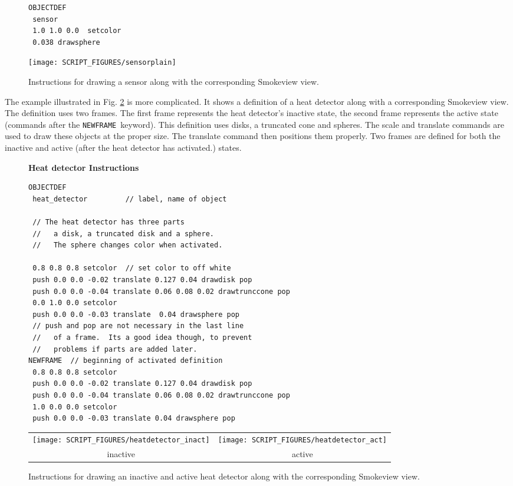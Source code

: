 \documentclass[11pt,twoside]{book}
\begin{document}
\begin{figure}[\figoptions]
{\small
\begin{lstlisting}[frame=single,rulecolor=\color{yellow},
framerule=1pt,framesep=1pc,fillcolor=\color{yellow}]
OBJECTDEF
 sensor
 1.0 1.0 0.0  setcolor
 0.038 drawsphere
\end{lstlisting}
}
\begin{center}
\texttt{[image: SCRIPT\_FIGURES/sensorplain]}\\
\end{center}
\caption{Instructions for drawing a sensor along with the corresponding Smokeview view.}
\label{figsensor}%
\end{figure}

The example illustrated in Fig. \ref{figsprinkler} is more complicated.
It shows a definition of a heat detector along with a corresponding
Smokeview view. The definition uses two frames. The first frame represents
the heat detector's inactive state, the second frame represents the active
state (commands after the {\tt NEWFRAME}\ keyword). This definition uses
disks, a truncated cone and spheres. The scale and translate commands are
used to draw these objects at the proper size. The translate command then
positions them properly.  Two frames are defined for both the inactive and
active (after the heat detector has activated.) states.

\begin{figure}[\figoptions]
{\bf Heat detector Instructions}\\
{\small
\begin{lstlisting}[frame=single,rulecolor=\color{yellow},
framerule=1pt,framesep=1pc,fillcolor=\color{yellow}]
OBJECTDEF
 heat_detector         // label, name of object

 // The heat detector has three parts
 //   a disk, a truncated disk and a sphere.
 //   The sphere changes color when activated.

 0.8 0.8 0.8 setcolor  // set color to off white
 push 0.0 0.0 -0.02 translate 0.127 0.04 drawdisk pop
 push 0.0 0.0 -0.04 translate 0.06 0.08 0.02 drawtrunccone pop
 0.0 1.0 0.0 setcolor
 push 0.0 0.0 -0.03 translate  0.04 drawsphere pop
 // push and pop are not necessary in the last line
 //   of a frame.  Its a good idea though, to prevent
 //   problems if parts are added later.
NEWFRAME  // beginning of activated definition
 0.8 0.8 0.8 setcolor
 push 0.0 0.0 -0.02 translate 0.127 0.04 drawdisk pop
 push 0.0 0.0 -0.04 translate 0.06 0.08 0.02 drawtrunccone pop
 1.0 0.0 0.0 setcolor
 push 0.0 0.0 -0.03 translate 0.04 drawsphere pop
\end{lstlisting}
}
\begin{center}
\begin{tabular}{cc}
 \texttt{[image: SCRIPT\_FIGURES/heatdetector\_inact]}&
 \texttt{[image: SCRIPT\_FIGURES/heatdetector\_act]}\\
inactive&active\\
 \end{tabular}
 \end{center}
\caption{Instructions for drawing an inactive and active heat detector
along with the corresponding Smokeview view.}
\label{figsprinkler}%
\end{figure}
\end{document}
